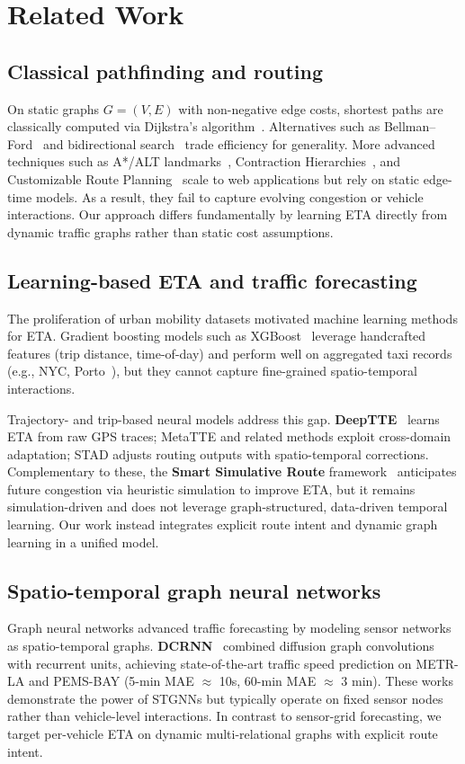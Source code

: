 \section{Related Work}

\subsection{Classical pathfinding and routing}
On static graphs $G=(V,E)$ with non-negative edge costs, shortest paths are classically computed via Dijkstra’s algorithm~\cite{dijkstra1959}. Alternatives such as Bellman–Ford~\cite{bellman1958routing} and bidirectional search~\cite{pohl1971bi} trade efficiency for generality. More advanced techniques such as A*/ALT landmarks~\cite{goldberg2005}, Contraction Hierarchies~\cite{geisberger2008}, and Customizable Route Planning~\cite{delling2011} scale to web applications but rely on static edge-time models. As a result, they fail to capture evolving congestion or vehicle interactions. Our approach differs fundamentally by learning ETA directly from dynamic traffic graphs rather than static cost assumptions.

\subsection{Learning-based ETA and traffic forecasting}
The proliferation of urban mobility datasets motivated machine learning methods for ETA. Gradient boosting models such as XGBoost~\cite{chen2016xgboost} leverage handcrafted features (trip distance, time-of-day) and perform well on aggregated taxi records (e.g., NYC, Porto~\cite{nyc_tlc,moreira2013porto}), but they cannot capture fine-grained spatio-temporal interactions.

Trajectory- and trip-based neural models address this gap. \textbf{DeepTTE}~\cite{deepTTE2018} learns ETA from raw GPS traces; MetaTTE and related methods exploit cross-domain adaptation; STAD adjusts routing outputs with spatio-temporal corrections. Complementary to these, the \textbf{Smart Simulative Route} framework~\cite{SmartSimulativeRoute2025} anticipates future congestion via heuristic simulation to improve ETA, but it remains simulation-driven and does not leverage graph-structured, data-driven temporal learning. Our work instead integrates explicit route intent and dynamic graph learning in a unified model.

\subsection{Spatio-temporal graph neural networks}
Graph neural networks advanced traffic forecasting by modeling sensor networks as spatio-temporal graphs. \textbf{DCRNN}~\cite{dcrnn2018} combined diffusion graph convolutions with recurrent units, achieving state-of-the-art traffic speed prediction on METR-LA and PEMS-BAY (5-min MAE $\approx$ 10s, 60-min MAE $\approx$ 3 min). These works demonstrate the power of STGNNs but typically operate on fixed sensor nodes rather than vehicle-level interactions. In contrast to sensor-grid forecasting, we target per-vehicle ETA on dynamic multi-relational graphs with explicit route intent.

